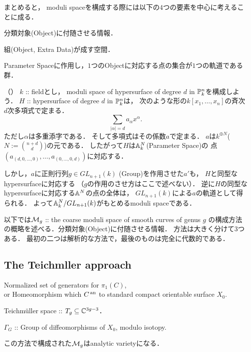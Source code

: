 \documentclass[a4paper]{jsarticle}
\begin{document}
    まとめると，
    moduli spaceを構成する際には以下の$4$つの要素を中心に考えることに成る．
    \begin{description}[leftmargin=!,labelwidth=\widthof{\bfseries Container Space}]
        \item[Extra Data] 分類対象(Object)に付随させる情報．
        \item[Parameter Space] 組(Object, Extra Data)が成す空間．
        \item[Group] Parameter Spaceに作用し，$1$つのObjectに対応する点の集合が$1$つの軌道である群．
    \end{description}
    
    \begin{Example}（\cite{Muk1}）
        $k$ :: fieldとし，
        moduli space of hypersurface of degree $d$ in $\mathbb{P}_{k}^n$を構成しよう．
        $H$ :: hypersurface of degree $d$ in $\mathbb{P}_{k}^n$は，
        次のような形の$k[x_1,\dots,x_n]$の斉次$d$次多項式で定まる．
        \[ \sum_{|\alpha|=d} a_{\alpha} x^{\alpha}. \]
        ただし$\alpha$は多重添字である．
        そして多項式はその係数$a$で定まる．
        $a$は$k^{\oplus N}$($N:=\binom{n+d}{d}$)の元である．
        したがって$H$は$\mathbb{A}_k^N$(Parameter Space)の
        点$(a_{(d,0,\dots,0)}, \dots, a_{(0,\dots,0,d)})$に対応する．

        しかし，$a$に正則行列$g \in GL_{n+1}(k)$ (Group)を作用させた$a'$も，
        $H$と同型なhypersurfaceに対応する
        （$g$の作用のさせ方はここで述べない）．
        逆に$H$の同型なhypersurfaceに対応する$\mathbb{A}^N$の点の全体は，
        $GL_{n+1}(k)$による$a$の軌道として得られる．
        よって$\mathbb{A}_k^N/GL_{n+1}(k)$がもとめるmoduli spaceである．
    \end{Example}

    以下では$\mathcal{M}_g$ :: the coarse moduli space of smooth curves of genus $g$
    の構成方法の概略を述べる．分類対象(Object)に付随させる情報．
    方法は大きく分けて$3$つある．
    最初の二つは解析的な方法で，最後のものは完全に代数的である．

    \subsection{The Teichmller approach}
    \begin{description}[leftmargin=!,labelwidth=\widthof{\bfseries Parameter Space}]
        \item[Extra Data]
            Normalized set of generators for $\pi_1(C)$, \\
            or Homeomorphism which ${C}^{\,\mathrm{an}}$ to standard compact orientable surface $X_0$.
        \item[Parameter Space] Teichm\"uller space :: $T_g \subseteq \mathbb{C}^{3g-3}$．
        \item[Group] $\Gamma_G$ :: Group of diffeomorphisms of $X_0$, modulo isotopy.
    \end{description}
    この方法で構成された$\mathcal{M}_g$はanalytic varietyになる．
\end{document}
